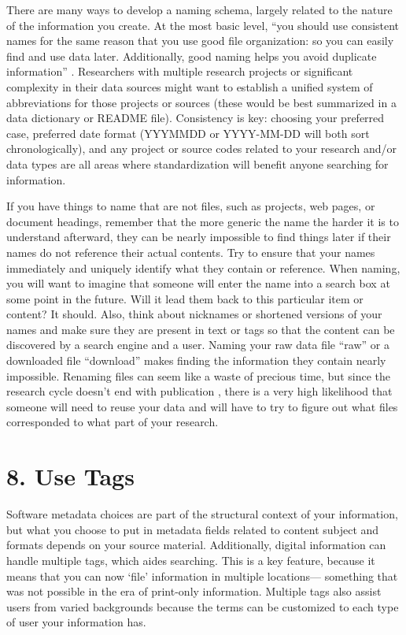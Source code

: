 \documentclass[10pt,letterpaper]{article}
\newcommand{\rulemajor}[1]{\section*{#1}}
\begin{document}
There are many ways to develop a naming schema, largely related to the
nature of the information you create. At the most basic level, ``you
should use consistent names for the same reason that you use good file
organization: so you can easily find and use data later. Additionally,
good naming helps you avoid duplicate information'' \cite{Briney2015}. Researchers
with multiple research projects or significant complexity in their data
sources might want to establish a unified system of abbreviations for
those projects or sources (these would be best summarized in a data
dictionary or README file). Consistency is key: choosing your preferred
case, preferred date format (YYYMMDD or YYYY-MM-DD will both sort
chronologically), and any project or source codes related to your
research and/or data types are all areas where standardization will
benefit anyone searching for information.

If you have things to name that are not files, such as projects, web
pages, or document headings, remember that the more generic the name the
harder it is to understand afterward, they can be nearly impossible to
find things later if their names do not reference their actual contents.
Try to ensure that your names immediately and uniquely identify what
they contain or reference. When naming, you will want to imagine that
someone will enter the name into a search box at some point in the
future. Will it lead them back to this particular item or content? It
should. Also, think about nicknames or shortened versions of your names
and make sure they are present in text or tags so that the content can
be discovered by a search engine and a user. Naming your raw data file
``raw'' or a downloaded file ``download'' makes finding the information
they contain nearly impossible.
Renaming files can seem like a waste of precious time, but since the
research cycle doesn't end with publication \cite{Briney2015}, there is a very
high likelihood that someone will need to reuse your data and will have
to try to figure out what files corresponded to what part of your
research.

\rulemajor{8. Use Tags}

Software metadata choices are part of the structural context of your
information, but what you choose to put in metadata fields related to
content subject and formats depends on your source material.
Additionally, digital information can handle multiple tags, which aides
searching.
This is a key feature, because it means that you can now `file'
information in multiple locations--- something that was not possible in
the era of print-only information. Multiple tags also assist users from
varied backgrounds because the terms can be customized to each type of
user your information has.
\end{document}
